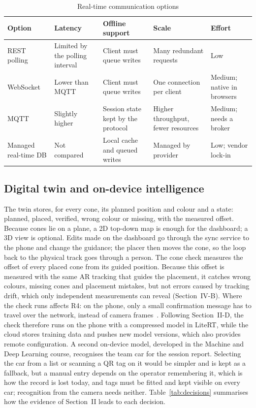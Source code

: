 \begin{table}[!t]
\caption{Real-time communication options}
\label{tab:comms}
\centering
\footnotesize
\setlength{\tabcolsep}{3pt}
\renewcommand{\arraystretch}{1.12}
\begin{tabular}{|L{0.16\columnwidth}|L{0.19\columnwidth}|L{0.19\columnwidth}|L{0.17\columnwidth}|L{0.15\columnwidth}|}
\hline
\textbf{Option} & \textbf{Latency} & \textbf{Offline support} & \textbf{Scale} & \textbf{Effort} \\ \hline
REST polling & Limited by the polling interval & Client must queue writes & Many redundant requests & Low \\ \hline
WebSocket & Lower than MQTT~\cite{ajayi2023} & Client must queue writes & One connection per client & Medium; native in browsers \\ \hline
MQTT & Slightly higher~\cite{ajayi2023} & Session state kept by the protocol~\cite{mqtt5} & Higher throughput, fewer resources~\cite{ajayi2023} & Medium; needs a broker \\ \hline
Managed real-time DB & Not compared & Local cache and queued writes~\cite{firebaseoffline} & Managed by provider & Low; vendor lock-in \\ \hline
\end{tabular}
\end{table}

\subsection{Digital twin and on-device intelligence}
The twin stores, for every cone, its planned position and colour and a state: planned, placed, verified, wrong colour or missing, with the measured offset. Because cones lie on a plane, a 2D top-down map is enough for the dashboard; a 3D view is optional. Edits made on the dashboard go through the sync service to the phone and change the guidance; the placer then moves the cone, so the loop back to the physical track goes through a person. The cone check measures the offset of every placed cone from its guided position. Because this offset is measured with the same AR tracking that guides the placement, it catches wrong colours, missing cones and placement mistakes, but not errors caused by tracking drift, which only independent measurements can reveal (Section~IV-B). Where the check runs affects R4: on the phone, only a small confirmation message has to travel over the network, instead of camera frames~\cite{chen2019}. Following Section~II-D, the check therefore runs on the phone with a compressed model in LiteRT, while the cloud stores training data and pushes new model versions, which also provides remote configuration. A second on-device model, developed in the Machine and Deep Learning course, recognises the team car for the session report. Selecting the car from a list or scanning a QR tag on it would be simpler and is kept as a fallback, but a manual entry depends on the operator remembering it, which is how the record is lost today, and tags must be fitted and kept visible on every car; recognition from the camera needs neither. Table~\ref{tab:decisions} summarises how the evidence of Section~II leads to each decision.

